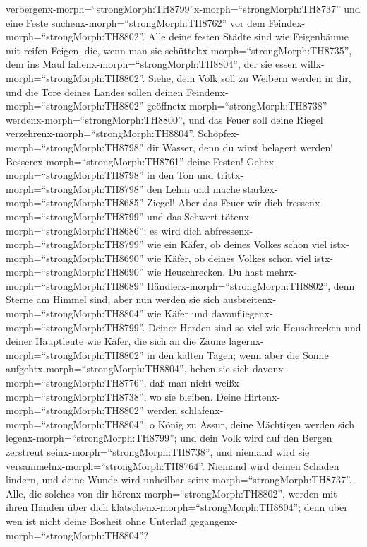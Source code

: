verbergenx-morph=``strongMorph:TH8799''x-morph=``strongMorph:TH8737''
und eine Feste suchenx-morph=``strongMorph:TH8762'' vor dem
Feindex-morph=``strongMorph:TH8802''.  Alle deine festen
Städte sind wie Feigenbäume mit reifen Feigen, die, wenn man sie
schütteltx-morph=``strongMorph:TH8735'', dem ins Maul
fallenx-morph=``strongMorph:TH8804'', der sie essen
willx-morph=``strongMorph:TH8802''.  Siehe, dein Volk soll
zu Weibern werden in dir, und die Tore deines Landes sollen deinen
Feindenx-morph=``strongMorph:TH8802''
geöffnetx-morph=``strongMorph:TH8738''
werdenx-morph=``strongMorph:TH8800'', und das Feuer soll deine Riegel
verzehrenx-morph=``strongMorph:TH8804''. 
Schöpfex-morph=``strongMorph:TH8798'' dir Wasser, denn du wirst belagert
werden! Besserex-morph=``strongMorph:TH8761'' deine Festen!
Gehex-morph=``strongMorph:TH8798'' in den Ton und
trittx-morph=``strongMorph:TH8798'' den Lehm und mache
starkex-morph=``strongMorph:TH8685'' Ziegel!  Aber das
Feuer wir dich fressenx-morph=``strongMorph:TH8799'' und das Schwert
tötenx-morph=``strongMorph:TH8686''; es wird dich
abfressenx-morph=``strongMorph:TH8799'' wie ein Käfer, ob deines Volkes
schon viel istx-morph=``strongMorph:TH8690'' wie Käfer, ob deines Volkes
schon viel istx-morph=``strongMorph:TH8690'' wie Heuschrecken.
 Du hast mehrx-morph=``strongMorph:TH8689''
Händlerx-morph=``strongMorph:TH8802'', denn Sterne am Himmel sind; aber
nun werden sie sich ausbreitenx-morph=``strongMorph:TH8804'' wie Käfer
und davonfliegenx-morph=``strongMorph:TH8799''.  Deiner
Herden sind so viel wie Heuschrecken und deiner Hauptleute wie Käfer,
die sich an die Zäune lagernx-morph=``strongMorph:TH8802'' in den kalten
Tagen; wenn aber die Sonne aufgehtx-morph=``strongMorph:TH8804'', heben
sie sich davonx-morph=``strongMorph:TH8776'', daß man nicht
weißx-morph=``strongMorph:TH8738'', wo sie bleiben.  Deine
Hirtenx-morph=``strongMorph:TH8802'' werden
schlafenx-morph=``strongMorph:TH8804'', o König zu Assur, deine
Mächtigen werden sich legenx-morph=``strongMorph:TH8799''; und dein Volk
wird auf den Bergen zerstreut seinx-morph=``strongMorph:TH8738'', und
niemand wird sie versammelnx-morph=``strongMorph:TH8764''. 
Niemand wird deinen Schaden lindern, und deine Wunde wird unheilbar
seinx-morph=``strongMorph:TH8737''. Alle, die solches von dir
hörenx-morph=``strongMorph:TH8802'', werden mit ihren Händen über dich
klatschenx-morph=``strongMorph:TH8804''; denn über wen ist nicht deine
Bosheit ohne Unterlaß gegangenx-morph=``strongMorph:TH8804''?
